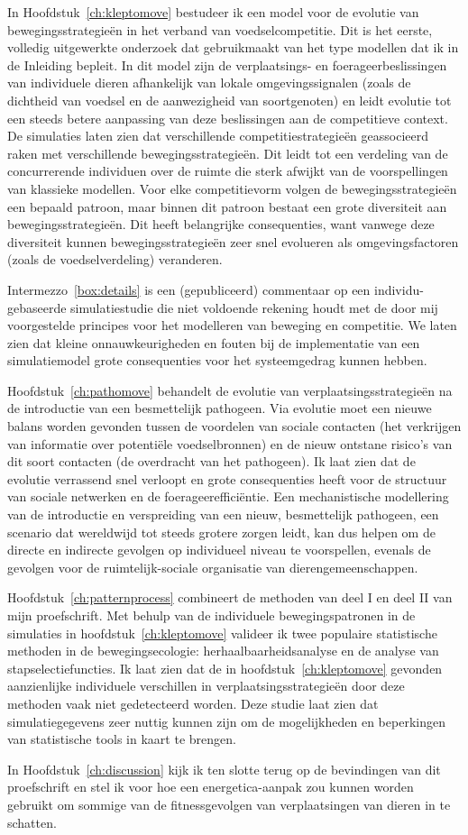 In Hoofdstuk~\ref{ch:kleptomove} bestudeer ik een model voor de evolutie van bewegingsstrategie{\"e}n in het verband van voedselcompetitie. Dit is het eerste, volledig uitgewerkte onderzoek dat gebruikmaakt van het type modellen dat ik in de Inleiding bepleit. In dit model zijn de verplaatsings- en foerageerbeslissingen van individuele dieren afhankelijk van lokale omgevingssignalen (zoals de dichtheid van voedsel en de aanwezigheid van soortgenoten) en leidt evolutie tot een steeds betere aanpassing van deze beslissingen aan de competitieve context. De simulaties laten zien dat verschillende competitiestrategie{\"e}n geassocieerd raken met verschillende bewegingsstrategie{\"e}n. Dit leidt tot een verdeling van de concurrerende individuen over de ruimte die sterk afwijkt van de voorspellingen van klassieke modellen. Voor elke competitievorm volgen de bewegingsstrategie{\"e}n een bepaald patroon, maar binnen dit patroon bestaat een grote diversiteit aan bewegingsstrategie{\"e}n. Dit heeft belangrijke consequenties, want vanwege deze diversiteit kunnen bewegingsstrategie{\"e}n zeer snel evolueren als omgevingsfactoren (zoals de voedselverdeling) veranderen.

Intermezzo~\ref{box:details} is een (gepubliceerd) commentaar op een individu-gebaseerde simulatiestudie die niet voldoende rekening houdt met de door mij voorgestelde principes voor het modelleren van beweging en competitie. We laten zien dat kleine onnauwkeurigheden en fouten bij de implementatie van een simulatiemodel grote consequenties voor het systeemgedrag kunnen hebben.

Hoofdstuk~\ref{ch:pathomove} behandelt de evolutie van verplaatsingsstrategie{\"e}n na de introductie van een besmettelijk pathogeen. Via evolutie moet een nieuwe balans worden gevonden tussen de voordelen van sociale contacten (het verkrijgen van informatie over potenti{\"e}le voedselbronnen) en de nieuw ontstane  risico's van dit soort contacten (de overdracht van het pathogeen). Ik laat zien dat de evolutie verrassend snel verloopt en grote consequenties heeft voor de structuur van sociale netwerken en de foerageereffici{\"e}ntie. Een mechanistische modellering van de introductie en verspreiding van een nieuw, besmettelijk pathogeen, een scenario dat wereldwijd tot steeds grotere zorgen leidt, kan dus helpen om de directe en indirecte gevolgen op individueel niveau te voorspellen, evenals de gevolgen voor de ruimtelijk-sociale organisatie van dierengemeenschappen.

Hoofdstuk~\ref{ch:patternprocess} combineert de methoden van deel I en deel II van mijn proefschrift. Met behulp van de individuele bewegingspatronen in de simulaties in hoofdstuk~\ref{ch:kleptomove} valideer ik twee populaire statistische methoden in de bewegingsecologie: herhaalbaarheidsanalyse en de analyse van stapselectiefuncties. Ik laat zien dat de in hoofdstuk~\ref{ch:kleptomove} gevonden aanzienlijke individuele verschillen in verplaatsingsstrategie{\"e}n door deze methoden vaak niet gedetecteerd worden. Deze studie laat zien dat simulatiegegevens zeer nuttig kunnen zijn om de mogelijkheden en beperkingen van statistische tools in kaart te brengen.

In Hoofdstuk~\ref{ch:discussion} kijk ik ten slotte terug op de bevindingen van dit proefschrift en stel ik voor hoe een energetica-aanpak zou kunnen worden gebruikt om sommige van de fitnessgevolgen van verplaatsingen van dieren in te schatten.

{ \begin{center}  \end{center} }
